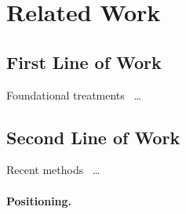 \section{Related Work}\label{sec:related}


\subsection{First Line of Work}\label{sec:related-first}
Foundational treatments~\parencite{placeholder-classic,placeholder-survey} \dots
{}

\subsection{Second Line of Work}\label{sec:related-second}
Recent methods~\parencite{placeholder-method-a,placeholder-method-b} \dots
{}

\paragraph{Positioning.}
